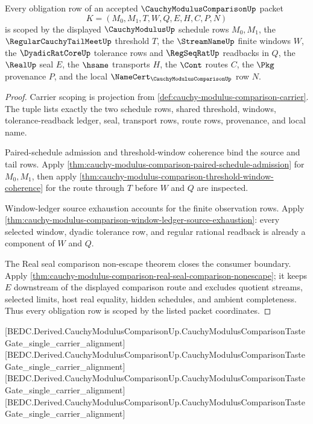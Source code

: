 \begin{theorem}
\label{thm:cauchy-modulus-comparison-scope-package}
Every obligation row of an accepted $\CauchyModulusComparisonUp$ packet
$$
K=(M_0,M_1,T,W,Q,E,H,C,P,N)
$$
is scoped by the displayed $\CauchyModulusUp$ schedule rows $M_0,M_1$, the $\RegularCauchyTailMeetUp$ threshold $T$, the $\StreamNameUp$ finite windows $W$, the $\DyadicRatCoreUp$ tolerance rows and $\RegSeqRatUp$ readbacks in $Q$, the $\RealUp$ seal $E$, the $\hsame$ transports $H$, the $\Cont$ routes $C$, the $\Pkg$ provenance $P$, and the local $\NameCert_{\CauchyModulusComparisonUp}$ row $N$.
\end{theorem}
\begin{proof}
Carrier scoping is projection from \autoref{def:cauchy-modulus-comparison-carrier}. The tuple lists exactly the two schedule rows, shared threshold, windows, tolerance-readback ledger, seal, transport rows, route rows, provenance, and local name.

Paired-schedule admission and threshold-window coherence bind the source and tail rows. Apply \autoref{thm:cauchy-modulus-comparison-paired-schedule-admission} for $M_0,M_1$, then apply \autoref{thm:cauchy-modulus-comparison-threshold-window-coherence} for the route through $T$ before $W$ and $Q$ are inspected.

Window-ledger source exhaustion accounts for the finite observation rows. Apply \autoref{thm:cauchy-modulus-comparison-window-ledger-source-exhaustion}: every selected window, dyadic tolerance row, and regular rational readback is already a component of $W$ and $Q$.

The Real seal comparison non-escape theorem closes the consumer boundary. Apply \autoref{thm:cauchy-modulus-comparison-real-seal-comparison-nonescape}; it keeps $E$ downstream of the displayed comparison route and excludes quotient streams, selected limits, host real equality, hidden schedules, and ambient completeness. Thus every obligation row is scoped by the listed packet coordinates.
\end{proof}

[BEDC.Derived.CauchyModulusComparisonUp.CauchyModulusComparisonTasteGate\_single\_carrier\_alignment]
[BEDC.Derived.CauchyModulusComparisonUp.CauchyModulusComparisonTasteGate\_single\_carrier\_alignment]
[BEDC.Derived.CauchyModulusComparisonUp.CauchyModulusComparisonTasteGate\_single\_carrier\_alignment]
[BEDC.Derived.CauchyModulusComparisonUp.CauchyModulusComparisonTasteGate\_single\_carrier\_alignment]

